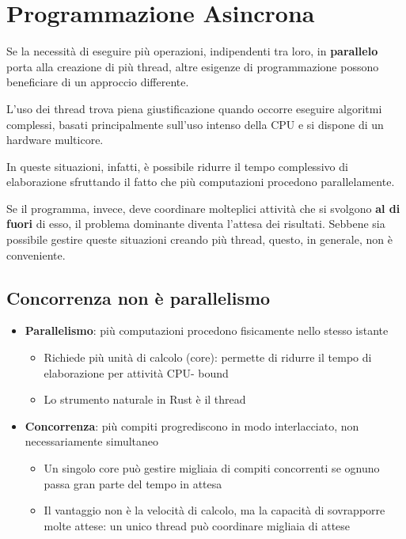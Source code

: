 \section{Programmazione Asincrona}

Se la necessità di eseguire più operazioni, indipendenti tra loro, in \textbf{parallelo} porta
alla creazione di più thread, altre esigenze di programmazione possono beneficiare
di un approccio differente.

L'uso dei thread trova piena giustificazione quando occorre eseguire algoritmi complessi, basati
principalmente sull'uso intenso della CPU e si dispone di un hardware multicore.

In queste situazioni, infatti, è possibile ridurre il tempo complessivo di elaborazione sfruttando il fatto
che più computazioni procedono parallelamente.

Se il programma, invece, deve coordinare molteplici attività che si svolgono \textbf{al di
  fuori} di esso, il problema dominante diventa l'attesa dei risultati.
Sebbene sia possibile gestire queste situazioni creando più thread, questo, in generale, non è
conveniente.

\subsection{Concorrenza non è parallelismo}
\begin{itemize}
  \item \textbf{Parallelismo}: più computazioni procedono fisicamente nello stesso istante
        \begin{itemize}
          \item Richiede più unità di calcolo (core): permette di ridurre il tempo di elaborazione per attività CPU-
                bound
          \item Lo strumento naturale in Rust è il thread
        \end{itemize}
  \item \textbf{Concorrenza}: più compiti progrediscono in modo interlacciato, non necessariamente simultaneo
        \begin{itemize}
          \item Un singolo core può gestire migliaia di compiti concorrenti se
                ognuno passa gran parte del tempo in attesa
          \item Il vantaggio non è la velocità di calcolo, ma la capacità di
                sovrapporre molte attese: un unico thread può coordinare migliaia di attese
        \end{itemize}
\end{itemize}


